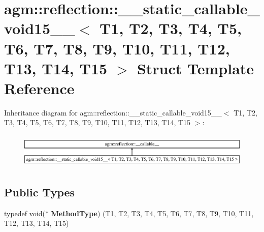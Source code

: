 \hypertarget{structagm_1_1reflection_1_1____static__callable__void15____}{}\section{agm\+:\+:reflection\+:\+:\+\_\+\+\_\+static\+\_\+callable\+\_\+void15\+\_\+\+\_\+$<$ T1, T2, T3, T4, T5, T6, T7, T8, T9, T10, T11, T12, T13, T14, T15 $>$ Struct Template Reference}
\label{structagm_1_1reflection_1_1____static__callable__void15____}
Inheritance diagram for agm\+:\+:reflection\+:\+:\+\_\+\+\_\+static\+\_\+callable\+\_\+void15\+\_\+\+\_\+$<$ T1, T2, T3, T4, T5, T6, T7, T8, T9, T10, T11, T12, T13, T14, T15 $>$\+:\begin{figure}[H]
\begin{center}
\leavevmode
\includegraphics[height=1.689291cm]{structagm_1_1reflection_1_1____static__callable__void15____}
\end{center}
\end{figure}
\subsection*{Public Types}
\begin{DoxyCompactItemize}
\item 
typedef void($\ast$ {\bfseries Method\+Type}) (T1, T2, T3, T4, T5, T6, T7, T8, T9, T10, T11, T12, T13, T14, T15)\hypertarget{structagm_1_1reflection_1_1____static__callable__void15_____ab3060ebe5ba8b9497688c9a60c5adffb}{}\label{structagm_1_1reflection_1_1____static__callable__void15_____ab3060ebe5ba8b9497688c9a60c5adffb}

\end{DoxyCompactItemize}
